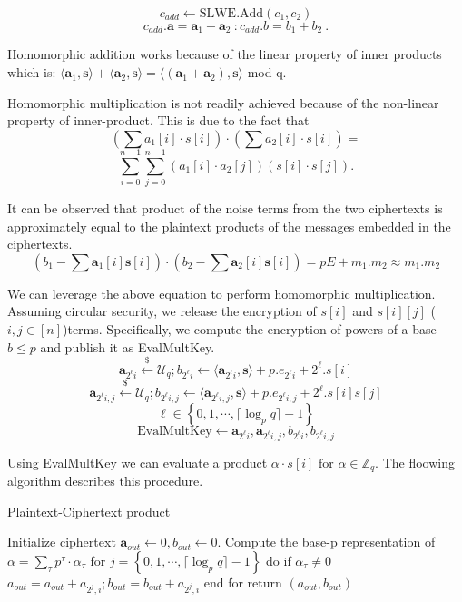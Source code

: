 \documentclass[10pt,journal,compsoc]{IEEEtran}
\theoremstyle{definition}
\begin{document}
$$c_{add} \leftarrow \textrm{SLWE.Add}(c_1,c_2)$$ $$c_{add}.\textbf{a} = \textbf{a}_1 + \textbf{a}_2\ \colon c_{add}.b = b_1 + b_2\ .$$

Homomorphic addition works because of the linear property of inner products which is:
$\langle \textbf{a}_1,\textbf{s}\rangle + \langle \textbf{a}_2,\textbf{s}\rangle = \langle \left(\textbf{a}_1 + \textbf{a}_2 \right),\textbf{s}\rangle$ mod-q.

Homomorphic multiplication is not readily achieved because of the non-linear property of inner-product. This is due to the fact that $$\left(\sum a_{1}[i]\cdot s[i]\right)\cdot \left(\sum a_2[i]\cdot s[i]\right) = $$ $$\sum_{i=0}^{n-1} \sum_{j=0}^{n-1} \left(a_1[i]\cdot a_2[j]\right)\left(s[i]\cdot s[j]\right).$$

It can be observed that product of the noise terms from the two ciphertexts is approximately equal to the plaintext products of the messages embedded in the ciphertexts.
$$\left(b_1 - \sum \textbf{a}_1[i]\textbf{s}[i] \right)\cdot \left(b_2 - \sum \textbf{a}_2[i]\textbf{s}[i] \right) = pE + m_1.m_2 \approx m_1.m_2$$

We can leverage the above equation to perform homomorphic multiplication. Assuming circular security, we release the encryption of  $s[i]$ and $s[i][j]$ ($i,j \in [n]$)terms. Specifically, we compute the encryption of powers of a base $b \leq p$ and publish it as EvalMultKey.
$$\textbf{a}_{2^{\ell}i} \xleftarrow{\$} \mathcal{U}_q ; b_{2^{\ell}i} \leftarrow \langle \textbf{a}_{2^{\ell}i},\textbf{s}\rangle +p.e_{2^{\ell}i} + 2^{\ell}.s[i]$$ 
$$\textbf{a}_{2^{\ell}i,j} \xleftarrow{\$} \mathcal{U}_q ; b_{2^{\ell}i,j} \leftarrow \langle \textbf{a}_{2^{\ell}i,j},\textbf{s}\rangle +p.e_{2^{\ell}i,j} + 2^{\ell}.s[i]s[j]$$
$$\ell \in \left\{0,1,\cdots,\lceil \log_p{q} \rceil -1 \right\}$$ 
$$\textrm{EvalMultKey} \leftarrow \textbf{a}_{2^{\ell}i},\textbf{a}_{2^{\ell}i,j},b_{2^{\ell}i},b_{2^{\ell}i,j}$$

Using EvalMultKey we can evaluate a product $\alpha\cdot s[i] \textrm{ for } \alpha \in \mathbb{Z}_q$. The floowing algorithm describes this procedure.
\begin{algorithm}
\caption{Plaintext-Ciphertext product}
\begin{algorithmic}[1]
\State Initialize ciphertext $\textbf{a}_{out}\leftarrow 0,b_{out}\leftarrow 0$.
\State Compute the base-p representation of $\alpha = \sum_{\tau} p^{\tau}\cdot \alpha_\tau$
\State for $j = \left\{ 0,1,\cdots,\lceil \log_p q\rceil -1 \right\}$ do
\State \quad if $\alpha_\tau \neq 0$
\State \quad $a_{out} = a_{out} + a_{2^j,i}; b_{out} = b_{out} + a_{2^j,i}$
\State end for
\State return $\left(a_{out},b_{out}\right)$

\EndProcedure
\end{algorithmic}
\end{algorithm}
\end{document}
